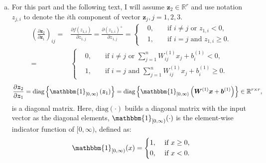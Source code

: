 \documentclass[10pt,a4paper]{article}
\theoremstyle{dotlessP}
\def\RR{\mathbb{R}}
\newcommand{\diag}{\text{diag}}
\newcommand{\dldy}{\frac{\partial l}{\partial \bm{\hat{y}}}}
\newcommand{\dydz}{\frac{\partial \bm{\hat{y}}}{\partial \bm z_3}}
\newcommand{\dzdz}{\frac{\partial \bm z_2}{\partial \bm z_1}}
\begin{document}
\begin{enumerate}[(a)]
\item For this part and the following text, I will assume $\bm z_2\in \RR^r$ and use notation $z_{j,i}$ to denote the $i$th component of vector $\bm z_j, j=1,2,3.$
\begin{equation}
\begin{aligned}
\left(\dzdz\right)_{ij} =&\frac{\partial f( z_{1,i})}{\partial z_{1,j}} = \frac{\partial ( z_{1,i})^+}{\partial z_{1,j}}
=\left\lbrace 
\begin{aligned}
&0, & &\text{ if } i\neq j \text{ or }   z_{1,i} <0,\\
& 1, &  &\text{ if } i= j \text{ and }   z_{1,i} \geq 0.
\end{aligned}
 \right. 
\\
=&\left\lbrace 
\begin{aligned}
&0, & &\text{ if } i\neq j \text{ or }   \sum_{j=1}^{n} W^{(1)}_{ij} x_j +b^{(1)}_i<0,\\
& 1, &  &\text{ if } i= j \text{ and }   \sum_{j=1}^{n} W^{(1)}_{ij} x_j +b^{(1)}_i \geq 0.
\end{aligned}
\right. 
\end{aligned}
\end{equation}
\begin{equation}
\dzdz =\diag\left\lbrace \mathbbm{1}_{[0,\infty)}\left(\bm z_1 \right)\right\rbrace =\diag\left\lbrace \mathbbm{1}_{[0,\infty)}\left(\bm W^{(1)} \bm x+\bm b^{(1)}\right)\right\rbrace \in \RR^{r\times r},
\end{equation}
is a diagonal matrix. Here, $\diag(\cdot)$ builds a diagonal matrix with the input vector as the diagonal elements, $\mathbbm{1}_{[0,\infty)}(\cdot)$ is the element-wise indicator function of $[0,\infty)$, defined as:
\begin{equation}
\mathbbm{1}_{[0,\infty)}(x)=\left\lbrace 
\begin{aligned}
&1, & &\text{ if } x\geq 0,\\
& 0, &  &\text{ if } x< 0.
\end{aligned}
\right. 
\end{equation}


\end{enumerate}
\end{document}
